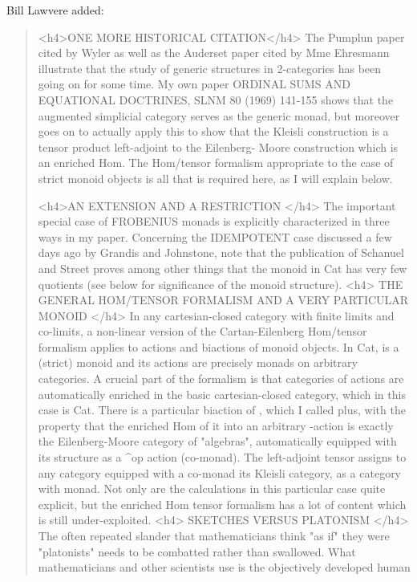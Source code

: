 Bill Lawvere added:
\begin{quote}

<h4>ONE MORE HISTORICAL CITATION</h4>
    The Pumplun paper cited by Wyler as well as the Auderset paper cited
by Mme Ehresmann illustrate that the study of generic structures in
2-categories has been going on for some time.  My own paper
ORDINAL SUMS AND EQUATIONAL DOCTRINES, SLNM 80 (1969) 141-155
shows that the augmented simplicial category \Delta  serves as the generic
monad, but moreover goes on to actually apply this to show that the
Kleisli construction is a tensor product left-adjoint to the Eilenberg-
Moore construction which is an enriched Hom. The Hom/tensor formalism
appropriate to the case of strict monoid objects is all that is required
here, as I will explain below.

<h4>AN EXTENSION AND A RESTRICTION
</h4>
    The important special case of FROBENIUS monads is explicitly
characterized in three ways in my paper.
    Concerning the IDEMPOTENT case discussed a few days ago by Grandis
and Johnstone, note that the publication of Schanuel and Street proves
among other things that the monoid \Delta  in Cat has very few quotients
(see below for significance of the monoid structure).
<h4>
THE GENERAL HOM/TENSOR FORMALISM AND A VERY PARTICULAR MONOID
</h4>
    In any cartesian-closed category with finite limits and co-limits, a
non-linear version of the Cartan-Eilenberg Hom/tensor formalism applies
to actions and biactions of monoid objects.  In Cat, \Delta  is a (strict)
monoid and its actions are precisely monads on arbitrary categories.  A
crucial part of the formalism is that categories of actions are
automatically enriched in the basic cartesian-closed category, which in
this case is Cat.  There is a particular biaction of \Delta , which I called
\Delta  plus, with the property that the enriched Hom of it into an
arbitrary \Delta -action is exactly the Eilenberg-Moore category of
"algebras", automatically equipped with its structure as a \Delta ^op action
(co-monad).  The left-adjoint tensor assigns to any category equipped with
a co-monad its Kleisli category, as a category with monad.  Not only are
the calculations in this particular case quite explicit, but the enriched
Hom tensor formalism has a lot of content which is still under-exploited.
<h4>
SKETCHES VERSUS PLATONISM
</h4>
     The often repeated slander that mathematicians think "as if" they
were "platonists" needs to be combatted rather than swallowed. What
mathematicians and other scientists use is the objectively developed human

\end{quote}
